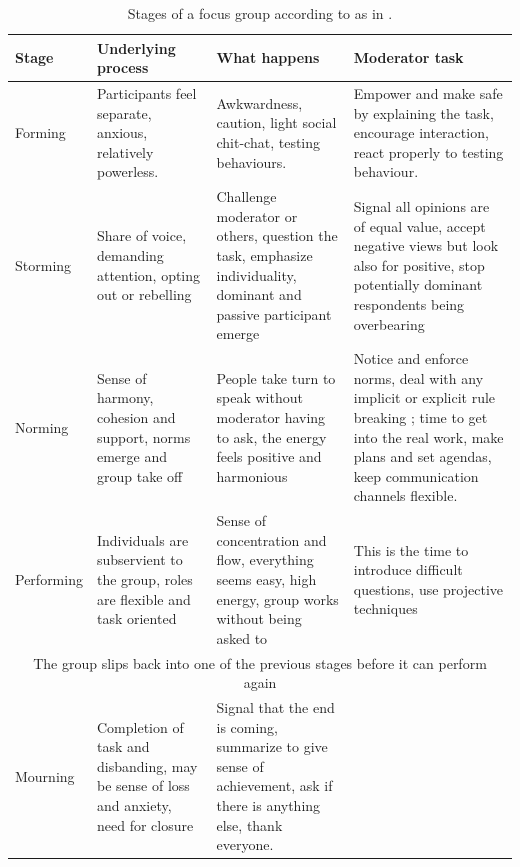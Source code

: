 \documentclass[10pt]{report}
\begin{document}
\begin{table}[!htbp]
\begin{center}
\begin{tabularx}{\textwidth}{lXXX}
\hline
Stage      & Underlying process & What happens & Moderator task \\
\hline \hline
Forming    & Participants feel separate, anxious, relatively powerless. & Awkwardness, caution, light social chit-chat, testing behaviours. & Empower and make safe by explaining the task, encourage interaction, react properly to testing behaviour. \\
\hline
Storming   & Share of voice, demanding attention, opting out or rebelling & Challenge moderator or others, question the task, emphasize individuality, dominant and passive participant emerge & Signal all opinions are of equal value, accept negative views but look also for positive, stop potentially dominant respondents being overbearing\\
\hline
Norming    &  Sense of harmony, cohesion and support, norms emerge and group take off & People take turn to speak without moderator having to ask, the energy feels positive and harmonious & Notice and enforce norms, deal with any implicit or explicit rule breaking ; time to get into the real work, make plans and set agendas, keep communication channels flexible.  \\
\hline
Performing & Individuals are subservient to the group, roles are flexible and task oriented & Sense of concentration and flow, everything seems easy, high energy, group works without being asked to & This is the time to introduce difficult questions, use projective techniques \\
\hline
\multicolumn{4}{c}{The group slips back into one of the previous stages before it can perform again} \\
\hline
Mourning   & Completion of task and disbanding, may be sense of loss and anxiety, need for closure & Signal that the end is coming, summarize to give sense of achievement, ask if there is anything else, thank everyone. &  \\
\hline
\end{tabularx}
\end{center}
\caption{Stages of a focus group according to \autocite{tuckman1965} as in \autocite{belk2007handbook}.}
\label{table:groupStagesTable}

\end{table}
\end{document}
